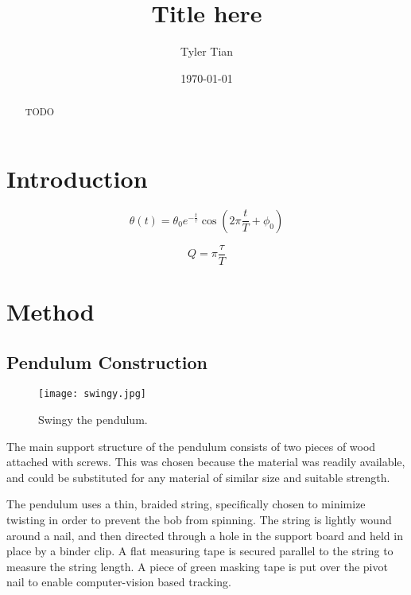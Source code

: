 \documentclass[aps,twocolumn,secnumarabic,nobalancelastpage,amsmath,amssymb,nofootinbib,floatfix,letterpaper]{revtex4}
\begin{document}
\title{Title here}
\author{Tyler Tian}
\noaffiliation
\date{\today}


\begin{abstract}
TODO
\end{abstract}

\maketitle


\section{Introduction}

\begin{equation}
    \theta(t) = \theta_0 e^{-\frac{t}{\tau}}\cos\left(2\pi\frac{t}{T} + \phi_0\right)
    \label{eqn:model}
\end{equation}

\begin{equation}
    Q = \pi\frac{\tau}{T}
    \label{eqn:qfactor}
\end{equation}


\section{Method}

\subsection{Pendulum Construction}

\begin{figure}[htb]
    \texttt{[image: swingy.jpg]}
    \caption{Swingy the pendulum.}
    \label{fig:swingy}
\end{figure}

The main support structure of the pendulum consists of two pieces of wood attached with screws.
This was chosen because the material was readily available, and could be substituted for any material of
similar size and suitable strength.

The pendulum uses a thin, braided string, specifically chosen to minimize twisting in order to prevent the bob from
spinning. The string is lightly wound around a nail, and then directed through a hole in the support board and held
in place by a binder clip. A flat measuring tape is secured parallel to the string to measure the string length. A
piece of green masking tape is put over the pivot nail to enable computer-vision based tracking.
\end{document}
